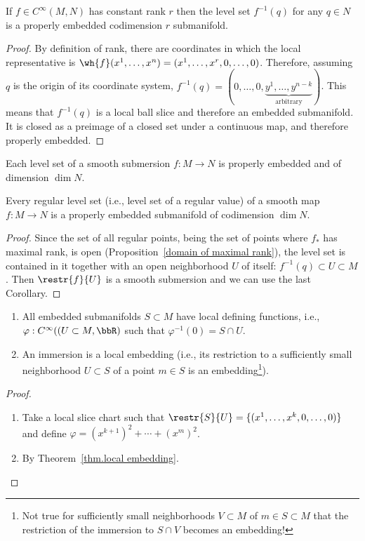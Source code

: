 \begin{thm}\label{thm level set submanifold}
    If $f\in C^\infty(M,N)$ has constant rank $r$ then the level set $f^{-1}(q)$ for any $q\in N$ is a properly embedded codimension $r$ submanifold.
\end{thm}
\begin{proof}
    By definition of rank, there are coordinates in which the local representative is $\wh{f}(x^1,\ldots,x^n)=(x^1,\ldots,x^r,0,\ldots,0)$. Therefore, assuming $q$ is the origin of its coordinate system, $f^{-1}(q)=(0,\ldots,0,\underbrace{y^1,\ldots,y^{n-k}}_{\text{arbitrary}})$. This means that $f^{-1}(q)$ is a local ball slice and therefore an embedded submanifold. It is closed as a preimage of a closed set under a continuous map, and therefore properly embedded.
\end{proof}
\begin{cor}
    Each level set of a smooth submersion $f:M\to N$ is properly embedded and of dimension $\dim N$.
\end{cor}
\begin{cor}\label{thm regular level set}
    Every regular level set (i.e., level set of a regular value) of a smooth map $f:M\to N$ is a properly embedded submanifold of codimension $\dim N$.
\end{cor}
\begin{proof}
    Since the set of all regular points, being the set of points where $f_{\ast}$ has maximal rank, is open (Proposition~\ref{domain of maximal rank}), the level set is contained in it together with an open neighborhood $U$ of itself: $f^{-1}(q)\subset U\subset M$. Then $\restr{f}{U}$ is a smooth submersion and we can use the last Corollary.
\end{proof}

\begin{prop}
\begin{enumerate}
    \item All embedded submanifolds $S\subset M$ have local defining functions, i.e., $\varphi:C^\infty((U\subset M, \bbR )$ such that $\varphi^{-1}(0)=S\cap U$.
    \item An immersion is a local embedding (i.e., its restriction to a sufficiently small neighborhood $U\subset S$ of a point $m\in S$ is an embedding\footnote{Not true for sufficiently small neighborhoods $V\subset M$ of $m\in S\subset M$ that the restriction of the immersion to $S\cap V$ becomes an embedding!}).
\end{enumerate}
\end{prop}
\begin{proof}
\begin{enumerate}
    \item Take a local slice chart such that $\restr{S}{U}=\{(x^1,\ldots,x^k,0,\ldots,0)\}$ and define $\varphi=(x^{k+1})^2+\cdots+(x^m)^2$.
    \item By Theorem~\ref{thm.local embedding}.
\end{enumerate}
\end{proof}

